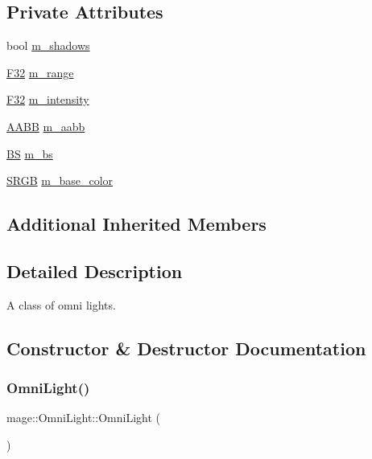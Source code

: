 \subsection*{Private Attributes}
\begin{DoxyCompactItemize}
\item 
bool \hyperlink{classmage_1_1_omni_light_a63e5dab12be5021815e98c81dd9aed6a}{m\+\_\+shadows}
\item 
\hyperlink{namespacemage_aa97e833b45f06d60a0a9c4fc22ae02c0}{F32} \hyperlink{classmage_1_1_omni_light_a0427a9c7f90750c645cd67ef0bafce47}{m\+\_\+range}
\item 
\hyperlink{namespacemage_aa97e833b45f06d60a0a9c4fc22ae02c0}{F32} \hyperlink{classmage_1_1_omni_light_aa0cbdebabf3ce0d8bbaeff7cf88cadd0}{m\+\_\+intensity}
\item 
\hyperlink{classmage_1_1_a_a_b_b}{A\+A\+BB} \hyperlink{classmage_1_1_omni_light_a9563f91a80b35fd4f9a7f73721457a8a}{m\+\_\+aabb}
\item 
\hyperlink{classmage_1_1_b_s}{BS} \hyperlink{classmage_1_1_omni_light_a11653a2018fbfddf5ecfcdfaa6449ccf}{m\+\_\+bs}
\item 
\hyperlink{structmage_1_1_s_r_g_b}{S\+R\+GB} \hyperlink{classmage_1_1_omni_light_ae48ee8d67341912519d793ec76269ab3}{m\+\_\+base\+\_\+color}
\end{DoxyCompactItemize}
\subsection*{Additional Inherited Members}


\subsection{Detailed Description}
A class of omni lights. 

\subsection{Constructor \& Destructor Documentation}
\hypertarget{classmage_1_1_omni_light_a7e415936a810268d874f198aa2a9e5d9}{}\label{classmage_1_1_omni_light_a7e415936a810268d874f198aa2a9e5d9} 
\subsubsection{\texorpdfstring{Omni\+Light()}{OmniLight()}\hspace{0.1cm}{\footnotesize\ttfamily [1/3]}}
{\footnotesize\ttfamily mage\+::\+Omni\+Light\+::\+Omni\+Light (\begin{DoxyParamCaption}{ }\end{DoxyParamCaption})\hspace{0.3cm}{\ttfamily [noexcept]}}

